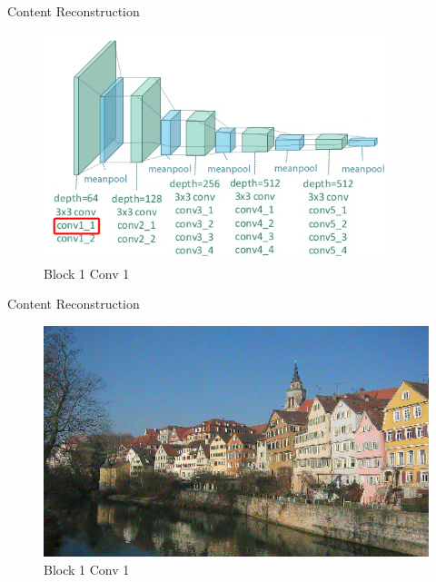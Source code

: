 \documentclass{beamer}
\begin{document}
\begin{frame}{Content Reconstruction}
\begin{figure}[ht]
\centering
\caption{Block 1 Conv 1}
\includegraphics[width=0.9\textwidth]{img/vgg19/content/block1_conv1}
\end{figure}
\end{frame}
\begin{frame}{Content Reconstruction}
\begin{figure}[ht]
\centering
\caption{Block 1 Conv 1}
\includegraphics[width=\textwidth]{img/content/block1_conv1.png}
\end{figure}
\end{frame}
\end{document}
